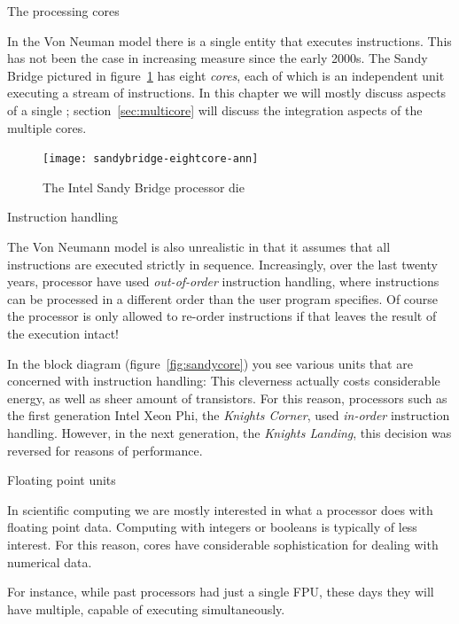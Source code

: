  {The processing cores}

In the Von Neuman model there is a single entity that executes instructions.
This has not been the case in increasing measure since the early 2000s.
The Sandy Bridge pictured in figure~\ref{fig:sandybridge} has eight \emph{cores},
each of which
is an independent unit executing a stream of instructions.
In this chapter we will mostly discuss aspects of a single ; 
section~\ref{sec:multicore} will discuss the integration aspects 
of the multiple cores.

\begin{figure}
  \texttt{[image: sandybridge-eightcore-ann]}
  \caption{The Intel Sandy Bridge processor die}
  \label{fig:sandybridge}
\end{figure}

 {Instruction handling}

 The Von
Neumann model is also unrealistic in that it assumes that all
instructions are executed strictly in sequence.  Increasingly, over
the last twenty years, processor have used
\emph{out-of-order}
instruction handling, where instructions can be processed
in a different order than the user program specifies. 
Of course the processor is only allowed to re-order instructions
if that leaves the result of the execution intact!

In the block diagram (figure~\ref{fig:sandycore}) you see various
units that are concerned with instruction handling: This cleverness
actually costs considerable energy, as well as sheer amount of
transistors. 
For this reason, processors such as the first generation
Intel Xeon Phi, the
\emph{Knights Corner},
used
\emph{in-order} instruction
handling.
However, in the next generation, the
\emph{Knights Landing},
this decision was reversed for reasons of performance.

 {Floating point units}
\label{sec:fma-trend}

In scientific computing we are mostly interested in what a processor
does with floating point data. Computing with integers or booleans 
is typically of less interest. For this reason, cores have
considerable sophistication for dealing with numerical data.

For instance, while past processors had just a single \acf{FPU},
these days they will have multiple, capable of executing
simultaneously.

